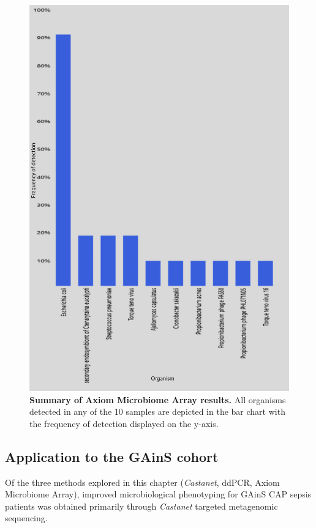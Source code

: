 \begin{figure}[htbp]
\centering
\includegraphics[scale=0.5]{./Results2/Images/MicrobeFrequencySpecies.png}
\caption[Summary of Axiom Microbiome Array results]{\textbf{Summary of Axiom Microbiome Array results.} All organisms detected in any of the 10 samples are depicted in the bar chart with the frequency of detection displayed on the y-axis.}
\label{fig:axiom-summary}
\end{figure}
\FloatBarrier
\subsection{Application to the GAinS cohort}
Of the three methods explored in this chapter (\textit{Castanet}, ddPCR, Axiom Microbiome Array), improved microbiological phenotyping for GAinS CAP sepsis patients was obtained primarily through \textit{Castanet} targeted metagenomic sequencing.

